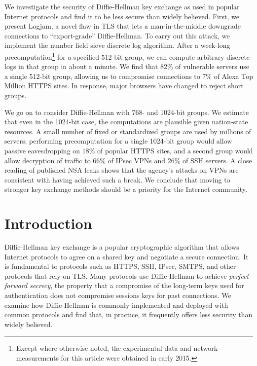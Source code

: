 We investigate the security of Diffie-Hellman key exchange as used in popular
Internet protocols and find it to be less secure than widely believed. First,
we present Logjam, a novel flaw in TLS that lets a man-in-the-middle
downgrade connections to ``export-grade'' Diffie-Hellman. To carry out this
attack, we implement the number field sieve discrete log algorithm. After a
week-long precomputation\footnote{\small Except where otherwise noted, the
experimental data and network measurements for this article were obtained in
early 2015.} for a specified 512-bit group, we can compute arbitrary discrete
logs in that group in about a minute. We find that 82\% of vulnerable servers
use a single 512-bit group, allowing us to compromise connections to 7\% of
Alexa Top Million HTTPS sites. In response, major browsers have changed to
reject short groups.

We go on to consider Diffie-Hellman with 768- and 1024-bit groups. We
estimate that even in the 1024-bit case, the computations are plausible given
nation-state resources. A small number of fixed or standardized groups are
used by millions of servers; performing precomputation for a single 1024-bit
group would allow passive eavesdropping on 18\% of popular HTTPS sites, and a
second group would allow decryption of traffic to 66\% of IPsec VPNs and 26\%
of SSH servers. A close reading of published NSA leaks shows that the
agency's attacks on VPNs are consistent with having achieved such a break. We
conclude that moving to stronger key exchange methods should be a priority
for the Internet community.

\section{Introduction}

Diffie-Hellman key exchange is a popular cryptographic algorithm that allows
Internet protocols to agree on a shared key and negotiate a secure
connection. It is fundamental to protocols such as HTTPS, SSH, IPsec, SMTPS,
and other protocols that rely on TLS\@. Many protocols use Diffie-Hellman to
achieve \emph{perfect forward secrecy}, the property that a compromise of the
long-term keys used for authentication does not compromise sessions keys for
past connections. We examine how Diffie-Hellman is commonly implemented and
deployed with common protocols and find that, in practice, it frequently
offers less security than widely believed.

